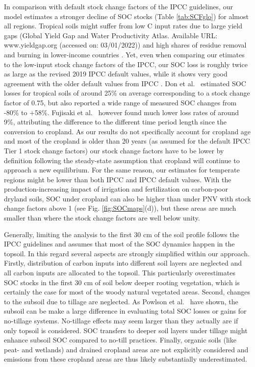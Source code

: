 \documentclass[gc, manuscript]{copernicus}
\begin{document}
In comparison with default stock change factors of the IPCC guidelines, our model estimates a stronger decline of SOC stocks (Table \ref{tab:SCFglo}) for almost all regions. Tropical soils might suffer from low C input rates due to large yield gaps (Global Yield Gap and Water Productivity Atlas. Available URL: www.yieldgap.org (accessed on: 03/01/2022)) and high shares of residue removal and burning in lower-income countries \citep{smil_crop_1999, williams_influence_1997, jain_emission_2014}. Yet, even when comparing our etimates to the low-input stock change factors of the IPCC, our SOC loss is roughly twice as large as the revised 2019 IPCC default values, while it shows very good agreement with the older default values from IPCC \citeyearpar{lasco_cropland_in_ipcc_2006}. Don et al.~\citeyearpar{don_impact_2011} estimated SOC losses for tropical soils of around 25\% on average corresponding to a stock change factor of 0.75, but also reported a wide range of measured SOC changes from -80\% to +58\%. Fujisaki et al.~\citeyearpar{fujisaki_forest_2015} however found much lower loss rates of around 9\%, attributing the difference to the different time period length since the conversion to cropland. As our results do not specifically account for cropland age and most of the cropland is older than 20 years (as assumed for the default IPCC Tier 1 stock change factors) our stock change factors have to be lower by definition following the steady-state assumption that cropland will continue to approach a new equilibrium. For the same reason, our estimates for temperate regions might be lower than both IPCC \citeyearpar{lasco_cropland_in_ipcc_2006} and IPCC \citeyearpar{ogle_cropland_in_ipcc_2019} default values.
With the production-increasing impact of irrigation and fertilization on carbon-poor dryland soils, SOC under cropland can also be higher than under PNV with stock change factors above 1 (see Fig. \ref{fig:SOCmaps}(d)), but these areas are much smaller than where the stock change factors are well below unity.

Generally, limiting the analysis to the first 30 cm of the soil profile follows the IPCC guidelines \citep{eggleston_ipcc_2006, calvo_buendia_ipcc_2019} and assumes that most of the SOC dynamics happen in the topsoil. In this regard several aspects are strongly simplified within our approach. Firstly, distribution of carbon inputs into different soil layers are neglected and all carbon inputs are allocated to the topsoil. This particularly overestimates SOC stocks in the first 30 cm of soil below deeper rooting vegetation, which is certainly the case for most of the woody natural vegetated areas. Second, changes to the subsoil due to tillage are neglected. As Powlson et al.~\citeyearpar{powlson_limited_2014} have shown, the subsoil can be make a large difference in evaluating total SOC losses or gains for no-tillage systems. No-tillage effects may seem larger than they actually are if only topsoil is considered. SOC transfers to deeper soil layers under tillage might enhance subsoil SOC compared to no-till practices. Finally, organic soils (like peat- and wetlands) and drained cropland areas are not explicitly considered and emissions from these cropland areas are thus likely substantially underestimated.
\end{document}
